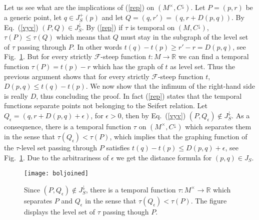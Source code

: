 \documentclass[a4paper]{jpconf}
\theoremstyle{definition}
\theoremstyle{remark}
\begin{document}
Let us see what are the implications of (\ref{rep}) on $(M^\times, C^\downarrow)$.  Let $P=(p,r)$ be a generic point, let $q\in J_S^+(p)$ and let $Q=(q,r')=(q,r+D(p,q))$. By  Eq.\ (\ref{vyv}) $(P,Q)\in J_S^\downarrow$. By (\ref{rep}) if $\tau$ is  temporal on $(M,C^\downarrow)$, $\tau(P)\le \tau(Q)$ which means that $Q$ must stay in the subgraph of the level set of $\tau$ passing through $P$. In other words $t(q)-t(p)\ge r'-r=D(p,q)$, see Fig.\ \ref{sxe}. But for every strictly $\mathscr{F}$-steep function $t\colon M\to \mathbb{R}$ we can find a temporal function $\tau(P)=t(p)-r$ which has the graph of $t$  as level set. Thus the previous argument shows that for every strictly $\mathscr{F}$-steep function $t$, $D(p,q)\le t(q)-t(p)$. We now show that the infimum of the right-hand side is really $D$, thus concluding the proof. In fact (\ref{rep}) states that the temporal functions separate points not belonging to the Seifert relation. Let $Q_\epsilon=(q,r+D(p,q)+\epsilon)$, for $\epsilon>0$, then by  Eq.\ (\ref{vyv}) $(P,Q_\epsilon)\notin J_S^\downarrow$. As a consequence, there is a temporal function $\tau$ on $(M^\times, C^\downarrow)$ which separates them in the sense that $\tau(Q_\epsilon)<\tau(P)$, which implies that the graphing function of the $\tau$-level set passing through $P$ satisfies $t(q)-t(p) \le D(p,q)+\epsilon$, see Fig.\ \ref{sxe}. Due to the arbitrariness of $\epsilon$ we get the distance formula for $(p,q)\in J_S$.

 \begin{figure}[ht]
\begin{center}
 \texttt{[image: boljoined]}
\end{center}
\caption{Since $(P,Q_\epsilon)\notin J_S^\downarrow$, there is a temporal function $\tau\colon M^\times \to\mathbb{R}$ which separates $P$ and $Q_\epsilon$ in the sense that $\tau(Q_\epsilon)<\tau(P)$. The figure displays the level set of $\tau$ passing though $P$.} \label{sxe}
\end{figure}
\end{document}
